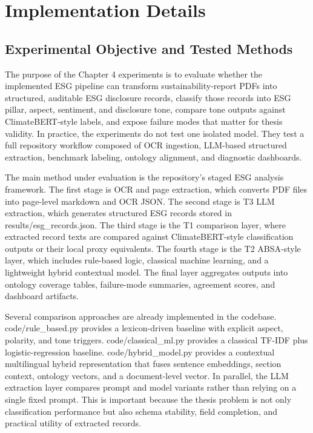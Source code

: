 \section{Implementation Details}
\subsection{Experimental Objective and Tested Methods}

The purpose of the Chapter 4 experiments is to evaluate whether the implemented ESG pipeline can transform sustainability-report PDFs into structured, auditable ESG disclosure records, classify those records into ESG pillar, aspect, sentiment, and disclosure tone, compare tone outputs against ClimateBERT-style labels, and expose failure modes that matter for thesis validity. In practice, the experiments do not test one isolated model. They test a full repository workflow composed of OCR ingestion, LLM-based structured extraction, benchmark labeling, ontology alignment, and diagnostic dashboards.

The main method under evaluation is the repository’s staged ESG analysis framework. The first stage is OCR and page extraction, which converts PDF files into page-level markdown and OCR JSON. The second stage is T3 LLM extraction, which generates structured ESG records stored in results/esg\_records.json. The third stage is the T1 comparison layer, where extracted record texts are compared against ClimateBERT-style classification outputs or their local proxy equivalents. The fourth stage is the T2 ABSA-style layer, which includes rule-based logic, classical machine learning, and a lightweight hybrid contextual model. The final layer aggregates outputs into ontology coverage tables, failure-mode summaries, agreement scores, and dashboard artifacts.

Several comparison approaches are already implemented in the codebase. code/rule\_based.py provides a lexicon-driven baseline with explicit aspect, polarity, and tone triggers. code/classical\_ml.py provides a classical TF-IDF plus logistic-regression baseline. code/hybrid\_model.py provides a contextual multilingual hybrid representation that fuses sentence embeddings, section context, ontology vectors, and a document-level vector. In parallel, the LLM extraction layer compares prompt and model variants rather than relying on a single fixed prompt. This is important because the thesis problem is not only classification performance but also schema stability, field completion, and practical utility of extracted records.

